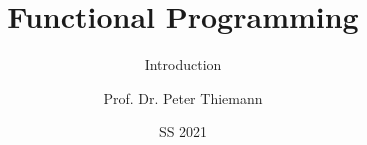 
\title{Functional Programming}
\subtitle{Introduction}

\author[Peter Thiemann]{Prof. Dr. Peter Thiemann}
\date{SS 2021}

